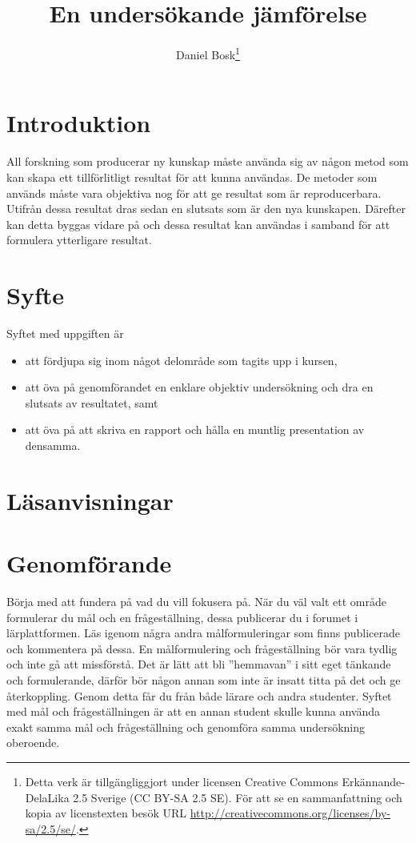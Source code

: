 \documentclass[a4paper]{miunasgn}
\title{En undersökande jämförelse}
\author{Daniel Bosk\thanks{%
	Detta verk är tillgängliggjort under licensen Creative Commons 
	Erkännande-DelaLika 2.5 Sverige (CC BY-SA 2.5 SE).
	För att se en sammanfattning och kopia av licenstexten besök URL 
	\url{http://creativecommons.org/licenses/by-sa/2.5/se/}.
	}
}
\date{\svnId}
\begin{document}
\maketitle
\thispagestyle{foot}
\tableofcontents


\section{Introduktion}
\noindent
All forskning som producerar ny kunskap måste använda sig av någon metod som 
kan skapa ett tillförlitligt resultat för att kunna användas.
De metoder som används måste vara objektiva nog för att ge resultat som är 
reproducerbara.
Utifrån dessa resultat dras sedan en slutsats som är den nya kunskapen.
Därefter kan detta byggas vidare på och dessa resultat kan användas i samband 
för att formulera ytterligare resultat.


\section{Syfte}
\noindent
Syftet med uppgiften är
\begin{itemize}
	\item att fördjupa sig inom något delområde som tagits upp i kursen,
	\item att öva på genomförandet en enklare objektiv undersökning och dra en 
		slutsats av resultatet, samt
	\item att öva på att skriva en rapport och hålla en muntlig presentation av 
		densamma.
\end{itemize}


\section{Läsanvisningar}
\noindent



\section{Genomförande}
\noindent
Börja med att fundera på vad du vill fokusera på.
När du väl valt ett område formulerar du mål och en frågeställning, dessa 
publicerar du i forumet i lärplattformen.
Läs igenom några andra målformuleringar som finns publicerade och kommentera på 
dessa.
En målformulering och frågeställning bör vara tydlig och inte gå att 
missförstå.
Det är lätt att bli ''hemmavan'' i sitt eget tänkande och formulerande, därför 
bör någon annan som inte är insatt titta på det och ge återkoppling.
Genom detta får du från både lärare och andra studenter.
Syftet med mål och frågeställningen är att en annan student skulle kunna 
använda exakt samma mål och frågeställning och genomföra samma undersökning 
oberoende.
\end{document}
